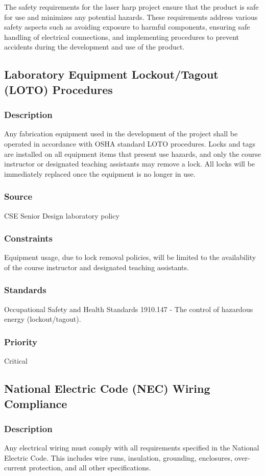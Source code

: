 The safety requirements for the laser harp project ensure that the product is safe for use and minimizes any potential hazards. These requirements address various safety aspects such as avoiding exposure to harmful components, ensuring safe handling of electrical connections, and implementing procedures to prevent accidents during the development and use of the product.

\subsection{Laboratory Equipment Lockout/Tagout (LOTO) Procedures}
\subsubsection{Description}
Any fabrication equipment used in the development of the project shall be operated in accordance with OSHA standard LOTO procedures. Locks and tags are installed on all equipment items that present use hazards, and only the course instructor or designated teaching assistants may remove a lock. All locks will be immediately replaced once the equipment is no longer in use.
\subsubsection{Source}
CSE Senior Design laboratory policy
\subsubsection{Constraints}
Equipment usage, due to lock removal policies, will be limited to the availability of the course instructor and designated teaching assistants.
\subsubsection{Standards}
Occupational Safety and Health Standards 1910.147 - The control of hazardous energy (lockout/tagout).
\subsubsection{Priority}
Critical

\subsection{National Electric Code (NEC) Wiring Compliance}
\subsubsection{Description}
Any electrical wiring must comply with all requirements specified in the National Electric Code. This includes wire runs, insulation, grounding, enclosures, over-current protection, and all other specifications.

